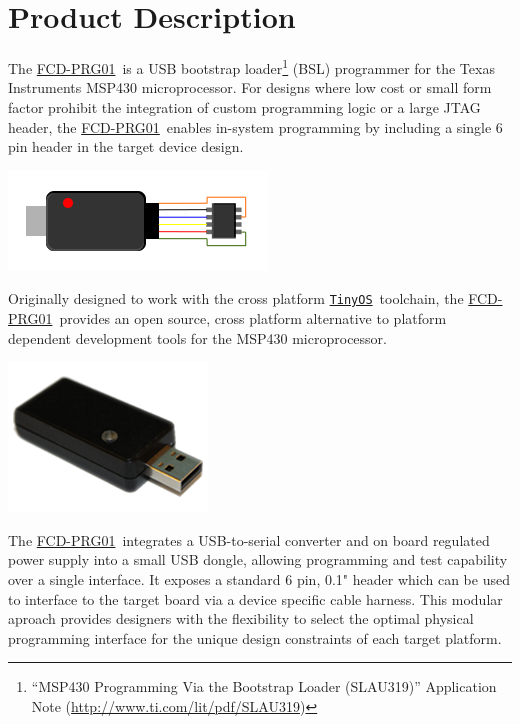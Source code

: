 \documentclass[10pt,letterpaper]{datasheet}
\newcommand{\PIDNOLINK}{FCD\nobreakdash-PRG01}
\newcommand{\PID}{\href{http://www.flyingcampdesign.com/msp430-bsl-programmer.html}{\PIDNOLINK}}
\newcommand{\tos}{\texttt{TinyOS}}
\newcommand{\tosurl}{\href{http://tinyos.net/}{\tos}}
\newcommand{\SLAUNOLINK}{SLAU319}
\newcommand{\SLAUPDFURL}{\href{http://www.ti.com/lit/pdf/SLAU319}{http://www.ti.com/lit/pdf/SLAU319}}
\begin{document}
\section*{Product Description}
\begin{multicols}{2}
  The \PID\ is a USB bootstrap loader\footnote{``MSP430 Programming Via the Bootstrap Loader (\SLAUNOLINK)'' Application Note (\SLAUPDFURL)} (BSL) programmer for the Texas Instruments MSP430 microprocessor.  For designs where low cost or small form factor prohibit the integration of custom programming logic or a large JTAG header, the \PID\ enables in-system programming by including a single 6 pin header in the target device design.

  \begin{center}
    \includegraphics[width=3 in]{fcd-prg01-diag}
  \end{center}

  Originally designed to work with the cross platform \tosurl\ toolchain, the \PID\ provides an open source, cross platform alternative to platform dependent development tools for the MSP430 microprocessor.

  \begin{center}
    \includegraphics[width=2 in]{fcd-prg01}
  \end{center}

  The \PID\ integrates a USB-to-serial converter and on board regulated power supply into a small USB dongle, allowing programming and test capability over a single interface.  It exposes a standard 6 pin, 0.1" header which can be used to interface to the target board via a device specific cable harness.  This modular aproach provides designers with the flexibility to select the optimal physical programming interface for the unique design constraints of each target platform.

\end{multicols}
\end{document}
